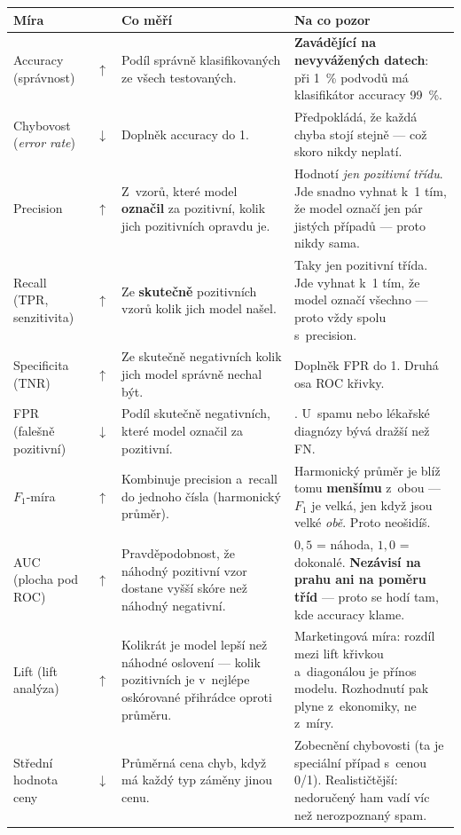 \documentclass[11pt,a4paper]{article}
\makeatletter
\newcommand{\up}{\textcolor{upcol}{$\boldsymbol{\uparrow}$}}
\newcommand{\down}{\textcolor{downcol}{$\boldsymbol{\downarrow}$}}
\newenvironment{mirytab}{%
  \par\medskip\noindent\small
  \begin{tabular}{@{}>{\raggedright\arraybackslash}p{3.15cm}
                    >{\centering\arraybackslash}p{0.85cm}
                    >{\raggedright\arraybackslash}p{5.3cm}
                    >{\raggedright\arraybackslash}p{6.1cm}@{}}
  \toprule
  \textbf{Míra} & & \textbf{Co měří} & \textbf{Na co pozor} \\
  \midrule}%
  {\bottomrule\end{tabular}\par\medskip}
\makeatother
\begin{document}
\begin{mirytab}
Accuracy \newline (správnost) & \up &
Podíl správně klasifikovaných ze všech testovaných. &
\textbf{Zavádějící na nevyvážených datech}: při 1~\% podvodů má klasifikátor
\uv{nikdy podvod} accuracy 99~\%. \\[2pt]

Chybovost \newline (\emph{error rate}) & \down &
Doplněk accuracy do 1. &
Předpokládá, že každá chyba stojí stejně --- což skoro nikdy neplatí. \\[2pt]

Precision & \up &
Z~vzorů, které model \textbf{označil} za pozitivní, kolik jich pozitivních opravdu je. &
Hodnotí \emph{jen pozitivní třídu}. Jde snadno vyhnat k~1 tím, že model označí jen
pár jistých případů --- proto nikdy sama. \\[2pt]

Recall \newline (TPR, senzitivita) & \up &
Ze \textbf{skutečně} pozitivních vzorů kolik jich model našel. &
Taky jen pozitivní třída. Jde vyhnat k~1 tím, že model označí všechno --- proto vždy
spolu s~precision. \\[2pt]

Specificita (TNR) & \up &
Ze skutečně negativních kolik jich model správně nechal být. &
Doplněk FPR do 1. Druhá osa ROC křivky. \\[2pt]

FPR \newline (falešně pozitivní) & \down &
Podíl skutečně negativních, které model označil za pozitivní. &
\uv{Falešný poplach}. U~spamu nebo lékařské diagnózy bývá dražší než FN. \\[2pt]

$F_1$-míra & \up &
Kombinuje precision a~recall do jednoho čísla (harmonický průměr). &
Harmonický průměr je blíž tomu \textbf{menšímu} z~obou --- $F_1$ je velká, jen když jsou
velké \emph{obě}. Proto neošidíš. \\[2pt]

AUC \newline (plocha pod ROC) & \up &
Pravděpodobnost, že náhodný pozitivní vzor dostane vyšší skóre než náhodný negativní. &
$0{,}5$ = náhoda, $1{,}0$ = dokonalé. \textbf{Nezávisí na prahu ani na poměru tříd} ---
proto se hodí tam, kde accuracy klame. \\[2pt]

Lift (lift analýza) & \up &
Kolikrát je model lepší než náhodné oslovení --- kolik pozitivních je v~nejlépe
oskórované přihrádce oproti průměru. &
Marketingová míra: rozdíl mezi lift křivkou a~diagonálou je přínos modelu.
Rozhodnutí \uv{kolik zásilek} pak plyne z~ekonomiky, ne z~míry. \\[2pt]

Střední hodnota ceny & \down &
Průměrná cena chyb, když má každý typ záměny jinou cenu. &
Zobecnění chybovosti (ta je speciální případ s~cenou 0/1). Realističtější:
nedoručený ham vadí víc než nerozpoznaný spam. \\
\end{mirytab}
\end{document}
